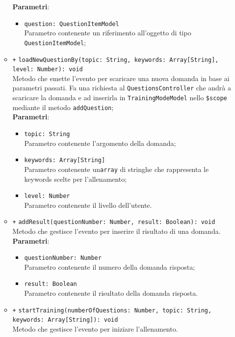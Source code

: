 \begin{itemize}
\begin{itemize}
		\textbf{Parametri}:
		\begin{itemize}
			\item \texttt{question: QuestionItemModel} \\
			Parametro contenente un riferimento all'oggetto di tipo \texttt{QuestionItemModel};
		\end{itemize}
		\item \texttt{+} \texttt{loadNewQuestionBy(topic: String, keywords: Array[String], level: Number): void} \\
		Metodo che emette l'evento per scaricare una nuova domanda in base ai parametri passati. Fa una richiesta al \texttt{QuestionsController} che andrà a scaricare la domanda e ad inserirla in \texttt{TrainingModeModel} nello \texttt{\$scope} mediante il metodo \texttt{addQuestion}; \\
		\textbf{Parametri}:
		\begin{itemize}
			\item \texttt{topic: String} \\
			Parametro contenente l'argomento della domanda;
			\item \texttt{keywords: Array[String]} \\
			Parametro contenente un\texttt{array} di stringhe che rappresenta le keywords scelte per l'allenamento;
			\item \texttt{level: Number} \\
			Parametro contenente il livello dell'utente.
		\end{itemize}
		\item \texttt{+} \texttt{addResult(questionNumber: Number, result: Boolean): void} \\
		Metodo che gestisce l'evento per inserire il risultato di una domanda. \\
		\textbf{Parametri}:
		\begin{itemize}
			\item \texttt{questionNumber: Number} \\
			Parametro contenente il numero della domanda risposta;
			\item \texttt{result: Boolean} \\
			Parametro contenente il risultato della domanda risposta.
		\end{itemize}
		\item \texttt{+} \texttt{startTraining(numberOfQuestions: Number, topic: String, keywords: Array[String]): void} \\
		Metodo che gestisce l'evento per iniziare l'allenamento. \\

\end{itemize}
\end{itemize}
